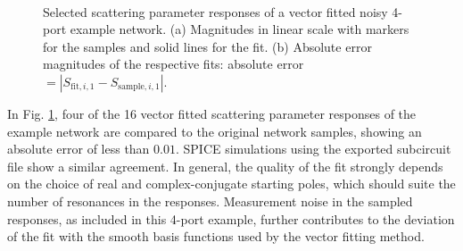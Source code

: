\documentclass[journal, onecolumn]{IEEEtran}
\begin{document}
\begin{figure}
\centering
{}
\\
\vspace{-4mm}
\caption{Selected scattering parameter responses of a vector fitted noisy 4-port example network. (a) Magnitudes in linear scale with markers for the samples and solid lines for the fit. (b) Absolute error magnitudes of the respective fits: absolute error $ = |S_{\mathrm{fit},i,1} - S_{\mathrm{sample},i,1}|$.}
\label{figs:vectfit}
\end{figure}

In Fig. \ref{figs:vectfit}, four of the 16 vector fitted scattering parameter responses of the example network are compared to the original network samples, showing an absolute error of less than $0.01$. SPICE simulations using the exported subcircuit file show a similar agreement. In general, the quality of the fit strongly depends on the choice of real and complex-conjugate starting poles, which should suite the number of resonances in the responses. Measurement noise in the sampled responses, as included in this 4-port example, further contributes to the deviation of the fit with the smooth basis functions used by the vector fitting method.
\end{document}
